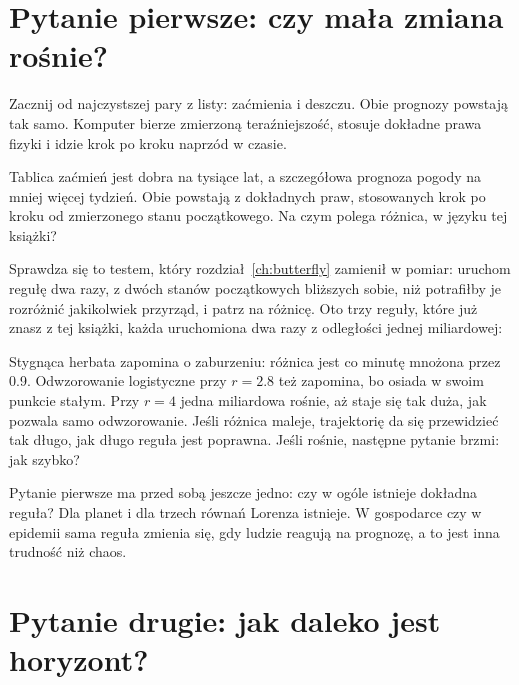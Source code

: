 \section{Pytanie pierwsze: czy mała zmiana rośnie?}
\label{sec:ch18-grow}

\noindent
Zacznij od najczystszej pary z listy: zaćmienia i deszczu. Obie prognozy
powstają tak samo. Komputer bierze zmierzoną teraźniejszość, stosuje
dokładne prawa fizyki i idzie krok po kroku naprzód w czasie.

\begin{think}
Tablica zaćmień jest dobra na tysiące lat, a szczegółowa prognoza pogody na
mniej więcej tydzień. Obie powstają z dokładnych praw, stosowanych krok po
kroku od zmierzonego stanu początkowego. Na czym polega różnica, w języku tej
książki?
\end{think}
Sprawdza się to testem, który rozdział~\ref{ch:butterfly} zamienił w pomiar:
uruchom regułę dwa razy, z dwóch stanów początkowych bliższych sobie, niż
potrafiłby je rozróżnić jakikolwiek przyrząd, i patrz na różnicę. Oto trzy
reguły, które już znasz z tej książki, każda uruchomiona dwa razy z
odległości jednej miliardowej:



\noindent
Stygnąca herbata zapomina o zaburzeniu: różnica jest co minutę mnożona
przez \num{0.9}. Odwzorowanie logistyczne przy $r = \num{2.8}$ też
zapomina, bo osiada w swoim punkcie stałym. Przy $r = 4$ jedna miliardowa
rośnie, aż staje się tak duża, jak pozwala samo odwzorowanie. Jeśli
różnica maleje, trajektorię da się przewidzieć tak długo, jak długo reguła
jest poprawna. Jeśli rośnie, następne pytanie brzmi: jak szybko?

Pytanie pierwsze ma przed sobą jeszcze jedno: czy w ogóle istnieje dokładna
reguła? Dla planet i dla trzech równań Lorenza istnieje. W gospodarce czy w
epidemii sama reguła zmienia się, gdy ludzie reagują na prognozę, a to jest
inna trudność niż chaos.

\section{Pytanie drugie: jak daleko jest horyzont?}
\label{sec:ch18-horizon}

